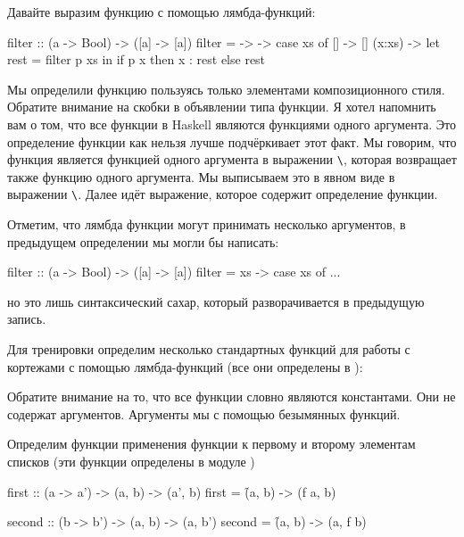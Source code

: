 Давайте выразим функцию  с помощью лямбда-функций:

\begin{code}
filter :: (a -> Bool) -> ([a] -> [a])
filter = \p -> \xs -> case xs of
    []     -> []
    (x:xs) -> let rest = filter p xs
              in  if   p x
                  then x : rest
                  else rest
\end{code}

Мы определили функцию  пользуясь только 
элементами композиционного стиля. Обратите внимание
на скобки в объявлении типа функции. Я хотел напомнить
вам о том, что все функции в Haskell  являются функциями
одного аргумента. Это определение функции 
как нельзя лучше подчёркивает этот факт. Мы говорим,
что  функция  является функцией одного аргумента
 в выражении \verb!\!, которая
возвращает также функцию одного аргумента. Мы выписываем
это в явном виде в выражении \verb!\!.
Далее идёт выражение, которое содержит определение функции. 

Отметим, что лямбда функции могут принимать несколько 
аргументов, в предыдущем определении мы могли бы написать:


\begin{code}
filter :: (a -> Bool) -> ([a] -> [a])
filter = \p xs -> case xs of
    ...
\end{code}

\noindent но это лишь синтаксический сахар, который разворачивается
в предыдущую запись.

Для тренировки определим несколько стандартных функций
для работы с кортежами с помощью лямбда-функций (все они
определены в ):


Обратите внимание на то, что все функции словно являются
константами. Они не содержат аргументов. Аргументы мы 
с помощью безымянных функций. 

Определим функции применения функции к первому и второму
элементам списков (эти функции определены в модуле  )

\begin{code}
first :: (a -> a') -> (a, b) -> (a', b)
first = \f (a, b) -> (f a, b)

second :: (b -> b') -> (a, b) -> (a, b')
second = \f (a, b) -> (a, f b)
\end{code}

